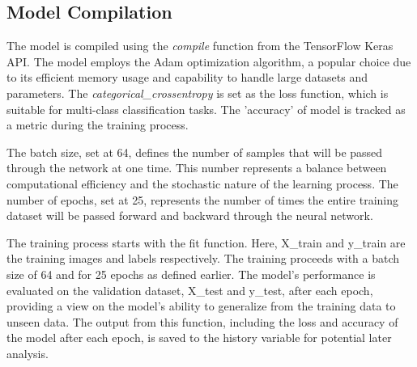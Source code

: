 \subsection{Model Compilation}
The model is compiled using the \textit{compile} function from the TensorFlow Keras API. The model employs the Adam optimization algorithm, a popular choice due to its efficient memory usage and capability to handle large datasets and parameters. The \textit{categorical\_crossentropy} is set as the loss function, which is suitable for multi-class classification tasks. The 'accuracy' of model is tracked as a metric during the training process.



The batch size, set at 64, defines the number of samples that will be passed through the network at one time. This number represents a balance between computational efficiency and the stochastic nature of the learning process. The number of epochs, set at 25, represents the number of times the entire training dataset will be passed forward and backward through the neural network.

The training process starts with the fit function. Here, X\_train and y\_train are the training images and labels respectively. The training proceeds with a batch size of 64 and for 25 epochs as defined earlier. The model's performance is evaluated on the validation dataset, X\_test and y\_test, after each epoch, providing a view on the model's ability to generalize from the training data to unseen data. The output from this function, including the loss and accuracy of the model after each epoch, is saved to the history variable for potential later analysis.



